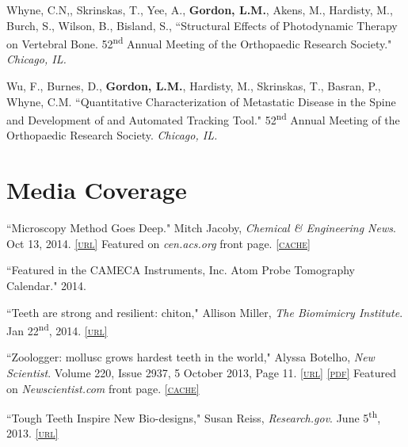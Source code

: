 Whyne, C.N,, Skrinskas, T., Yee, A., \textbf{Gordon, L.M.}, Akens, M., Hardisty, M., Burch, S., Wilson, B., Bisland, S., ``Structural Effects of Photodynamic Therapy on Vertebral Bone. 52\textsuperscript{nd} Annual Meeting of the Orthopaedic Research Society." \emph{Chicago, IL.}

Wu, F., Burnes, D., \textbf{Gordon, L.M.}, Hardisty, M., Skrinskas, T., Basran, P., Whyne, C.M. ``Quantitative Characterization of Metastatic Disease in the Spine and Development of and Automated Tracking Tool." 52\textsuperscript{nd} Annual Meeting of the Orthopaedic Research Society. \emph{Chicago, IL.}
\endgroup

\section*{Media Coverage}
``Microscopy Method Goes Deep." Mitch Jacoby, \emph{Chemical \& Engineering News}. Oct 13, 2014. \href{http://cen.acs.org/articles/92/i41/Microscopy-Method-Goes-Deep.html}{\textsc{\footnotesize{[url]}}} Featured on \emph{cen.acs.org} front page. \href{http://lylegordon.ca/chemengnews.png}{\textsc{\footnotesize{[cache]}}}
\begingroup\setlength{\parskip}{0.1cm}

``Featured in the CAMECA Instruments, Inc. Atom Probe Tomography Calendar." 2014.

``Teeth are strong and resilient: chiton," Allison Miller, \emph{The Biomimicry Institute}. Jan 22\textsuperscript{nd}, 2014. \href{http://www.asknature.org/strategy/fb5086ccd4ca1f0d5bf07e2394133877}{\textsc{\footnotesize{[url]}}} 

``Zoologger: mollusc grows hardest teeth in the world," Alyssa Botelho, \emph{New Scientist}. Volume 220, Issue 2937, 5 October 2013, Page 11. \href{http://www.newscientist.com/article/dn24329-zoologger-mollusc-grows-hardest-teeth-in-the-world.html#.Uk7GpMakpHV}{\textsc{\footnotesize{[url]}}} \href{http://lylegordon.ca/papers/NewSci2013.pdf}{\textsc{\footnotesize{[pdf]}}} Featured on \emph{Newscientist.com} front page. \href{http://lylegordon.ca/newsci.jpg}{\textsc{\footnotesize{[cache]}}}

``Tough Teeth Inspire New Bio-designs," Susan Reiss, \emph{Research.gov}. June 5\textsuperscript{th}, 2013. \href{http://www.research.gov/research-portal/appmanager/base/desktop;jsessionid=hFFMRyhFTMl4CQ76t1456YQ7LXd1RJYjQGVG1gmHP2Jcsny3ryW0!2110096251!130307470?_nfpb=true&_windowLabel=assetsInTheStates_1&_urlType=action&assetsInTheStates_1_action=selectAwardDetail&assetsInTheStates_1_id=%2FresearchGov/AwardHighlight/PublicAffairs/23492_ToughTeethInspireNewBio-designs.html}{\textsc{\footnotesize{[url]}}} 

